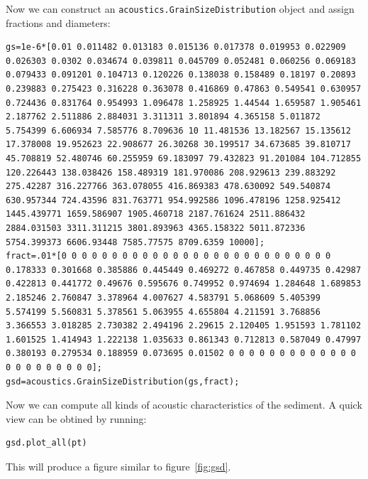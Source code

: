 \documentclass[]{artikel3}
\begin{document}
Now we can construct an \texttt{acoustics.GrainSizeDistribution} object and assign fractions and diameters:
\begin{lstlisting}
gs=1e-6*[0.01 0.011482 0.013183 0.015136 0.017378 0.019953 0.022909 0.026303 0.0302 0.034674 0.039811 0.045709 0.052481 0.060256 0.069183 0.079433 0.091201 0.104713 0.120226 0.138038 0.158489 0.18197 0.20893 0.239883 0.275423 0.316228 0.363078 0.416869 0.47863 0.549541 0.630957 0.724436 0.831764 0.954993 1.096478 1.258925 1.44544 1.659587 1.905461 2.187762 2.511886 2.884031 3.311311 3.801894 4.365158 5.011872 5.754399 6.606934 7.585776 8.709636 10 11.481536 13.182567 15.135612 17.378008 19.952623 22.908677 26.30268 30.199517 34.673685 39.810717 45.708819 52.480746 60.255959 69.183097 79.432823 91.201084 104.712855 120.226443 138.038426 158.489319 181.970086 208.929613 239.883292 275.42287 316.227766 363.078055 416.869383 478.630092 549.540874 630.957344 724.43596 831.763771 954.992586 1096.478196 1258.925412 1445.439771 1659.586907 1905.460718 2187.761624 2511.886432 2884.031503 3311.311215 3801.893963 4365.158322 5011.872336 5754.399373 6606.93448 7585.77575 8709.6359 10000];
fract=.01*[0 0 0 0 0 0 0 0 0 0 0 0 0 0 0 0 0 0 0 0 0 0 0 0 0 0 0 0.178333 0.301668 0.385886 0.445449 0.469272 0.467858 0.449735 0.42987 0.422813 0.441772 0.49676 0.595676 0.749952 0.974694 1.284648 1.689853 2.185246 2.760847 3.378964 4.007627 4.583791 5.068609 5.405399 5.574199 5.560831 5.378561 5.063955 4.655804 4.211591 3.768856 3.366553 3.018285 2.730382 2.494196 2.29615 2.120405 1.951593 1.781102 1.601525 1.414943 1.222138 1.035633 0.861343 0.712813 0.587049 0.47997 0.380193 0.279534 0.188959 0.073695 0.01502 0 0 0 0 0 0 0 0 0 0 0 0 0 0 0 0 0 0 0 0 0 0];
gsd=acoustics.GrainSizeDistribution(gs,fract);
\end{lstlisting}
Now we can compute all kinds of acoustic characteristics of the sediment. A quick view can be obtined by running:
\begin{lstlisting}
gsd.plot_all(pt)
\end{lstlisting}
This will produce a figure similar to figure~\ref{fig:gsd}.
\end{document}
